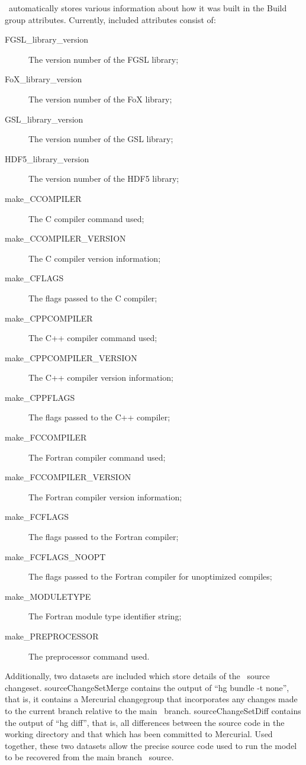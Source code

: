 \glc\ automatically stores various information about how it was built in the {\normalfont \ttfamily Build} group attributes. Currently, included attributes consist of:
\begin{description}
\item[{\normalfont \ttfamily FGSL\_library\_version}] The version number of the FGSL library;
\item[{\normalfont \ttfamily FoX\_library\_version}] The version number of the FoX library;
\item[{\normalfont \ttfamily GSL\_library\_version}] The version number of the GSL library;
\item[{\normalfont \ttfamily HDF5\_library\_version}] The version number of the HDF5 library;
\item[{\normalfont \ttfamily make\_CCOMPILER}] The C compiler command used;
\item[{\normalfont \ttfamily make\_CCOMPILER\_VERSION}] The C compiler version information;
\item[{\normalfont \ttfamily make\_CFLAGS}] The flags passed to the C compiler;
\item[{\normalfont \ttfamily make\_CPPCOMPILER}] The C++ compiler command used;
\item[{\normalfont \ttfamily make\_CPPCOMPILER\_VERSION}] The C++ compiler version information;
\item[{\normalfont \ttfamily make\_CPPFLAGS}] The flags passed to the C++ compiler;
\item[{\normalfont \ttfamily make\_FCCOMPILER}] The Fortran compiler command used;
\item[{\normalfont \ttfamily make\_FCCOMPILER\_VERSION}] The Fortran compiler version information;
\item[{\normalfont \ttfamily make\_FCFLAGS}] The flags passed to the Fortran compiler;
\item[{\normalfont \ttfamily make\_FCFLAGS\_NOOPT}] The flags passed to the Fortran compiler for unoptimized compiles;
\item[{\normalfont \ttfamily make\_MODULETYPE}] The Fortran module type identifier string;
\item[{\normalfont \ttfamily make\_PREPROCESSOR}] The preprocessor command used.
\end{description}

Additionally, two datasets are included which store details of the \glc\ source changeset. {\normalfont \ttfamily sourceChangeSetMerge} contains the output of ``{\normalfont \ttfamily hg bundle -t none}'', that is, it contains a Mercurial changegroup that incorporates any changes made to the current branch relative to the main \glc\ branch. {\normalfont \ttfamily sourceChangeSetDiff} contains the output of ``{\normalfont \ttfamily hg diff}'', that is, all differences between the source code in the working directory and that which has been committed to Mercurial. Used together, these two datasets allow the precise source code used to run the model to be recovered from the main branch \glc\ source.

